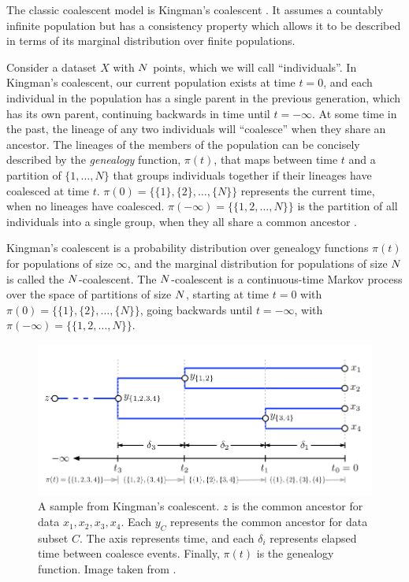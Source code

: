 The classic coalescent model is
Kingman's coalescent \citep{Kingman1982}.
It assumes a countably infinite population
but has a consistency property
which allows it to be described
in terms of its marginal distribution
over finite populations.

Consider a dataset $X$ with $N$ points, 
which we will call ``individuals''.
In Kingman's coalescent,
our current population exists at time $t = 0$,
and each individual in the population has a single
parent in the previous generation, which has its own parent,
continuing backwards in time until
$t = -\infty$. 
At some time in the past,
the lineage of any two individuals will ``coalesce''
when they share an ancestor.
The lineages of the members of the population
can be concisely described
by the
\emph{genealogy} function, $\pi(t)$,
that maps between time $t$
and a partition of $\{1, \ldots, N\}$
that groups individuals together
if their lineages have coalesced at time $t$.
$\pi(0) = \{\{1\}, \{2\},\ldots,\{N\}\}$
represents
the current time, when no
lineages have coalesced.
$\pi(-\infty) = \{\{1, 2, \ldots, N\}\}$
is the partition of all
individuals into a single group,
when they all share a common ancestor \citep{Teh2008}.

Kingman's coalescent
is a probability distribution
over genealogy functions $\pi(t)$
for populations of size $\infty$,
and the marginal distribution for
populations of size $N$ is called the $N$-coalescent.
The $N$-coalescent
is a continuous-time
Markov process
over the space of partitions
of size $N$,
starting at time $t = 0$ with
$\pi(0) = \{\{1\}, \{2\},\ldots,\{N\}\}$,
going backwards until  $t = -\infty$,
with
$\pi(-\infty) = \{\{1, 2, \ldots, N\}\}$.

\begin{figure}[H]
  \centering
  \includegraphics[width=\textwidth]{img/trees/coalescent}
  \caption{A sample from Kingman's coalescent. $z$ is
  the common ancestor for data $x_1, x_2, x_3, x_4$. Each $y_C$
  represents the common ancestor for data subset $C$. 
  The axis represents time, and each $\delta_i$ represents elapsed time between
  coalesce events. Finally, $\pi(t)$ is
  the genealogy function. Image taken from \citet{Teh2008}.}
\label{fig:coalescent}
\end{figure}

